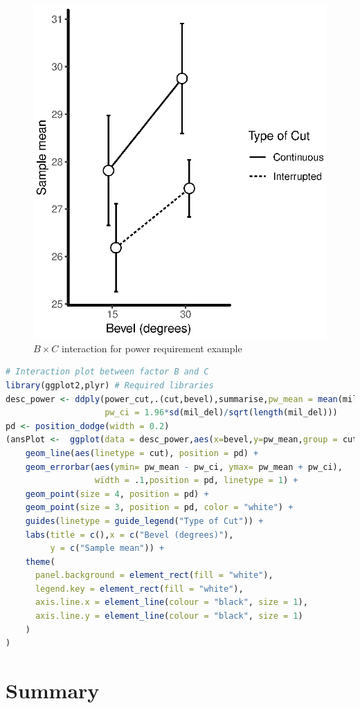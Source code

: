 \documentclass{WileySev}
\begin{document}
\begin{figure}
  \includegraphics[width=0.5\linewidth]{Ch1_interaction_plot.eps}
  \centering
  \caption{$B \times C$ interaction for power requirement example}
  \label{fig:ch1_interaction}
\end{figure}

\begin{lstlisting}[language=R]
# Interaction plot between factor B and C
library(ggplot2,plyr) # Required libraries
desc_power <- ddply(power_cut,.(cut,bevel),summarise,pw_mean = mean(mil_del),
                    pw_ci = 1.96*sd(mil_del)/sqrt(length(mil_del)))
pd <- position_dodge(width = 0.2)
(ansPlot <-  ggplot(data = desc_power,aes(x=bevel,y=pw_mean,group = cut))+
    geom_line(aes(linetype = cut), position = pd) +
    geom_errorbar(aes(ymin= pw_mean - pw_ci, ymax= pw_mean + pw_ci),
                  width = .1,position = pd, linetype = 1) +
    geom_point(size = 4, position = pd) +
    geom_point(size = 3, position = pd, color = "white") +
    guides(linetype = guide_legend("Type of Cut")) +
    labs(title = c(),x = c("Bevel (degrees)"),
         y = c("Sample mean")) +
    theme(
      panel.background = element_rect(fill = "white"),
      legend.key = element_rect(fill = "white"),
      axis.line.x = element_line(colour = "black", size = 1),
      axis.line.y = element_line(colour = "black", size = 1)
    )
)
\end{lstlisting}

\section{Summary}
\end{document}
